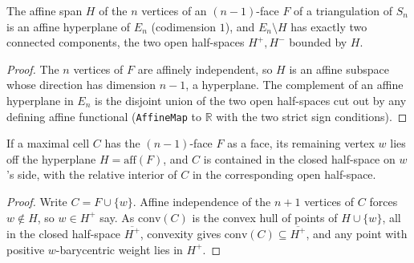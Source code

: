\begin{lemma}
    \label{lem:facet-hyperplane}
    The affine span $H$ of the $n$ vertices of an $(n-1)$-face $F$ of a
    triangulation of $S_n$ is an affine hyperplane of $E_n$ (codimension $1$),
    and $E_n \setminus H$ has exactly two connected components, the two open
    half-spaces $H^+, H^-$ bounded by $H$.
\end{lemma}
\begin{proof}
    The $n$ vertices of $F$ are affinely independent, so $H$ is an affine
    subspace whose direction has dimension $n-1$, a hyperplane. The complement of
    an affine hyperplane in $E_n$ is the disjoint union of the two open
    half-spaces cut out by any defining affine functional (\texttt{AffineMap}
    to $\mathbb R$ with the two strict sign conditions).
\end{proof}

\begin{lemma}
    \label{lem:cell-one-side}
    If a maximal cell $C$ has the $(n-1)$-face $F$ as a face, its remaining
    vertex $w$ lies off the hyperplane $H = \mathrm{aff}(F)$, and $C$ is contained
    in the closed half-space on $w$'s side, with the relative interior of $C$ in
    the corresponding open half-space.
\end{lemma}
\begin{proof}
    Write $C = F \cup \{w\}$. Affine independence of the $n+1$ vertices of $C$
    forces $w \notin H$, so $w \in H^+$ say. As $\mathrm{conv}(C)$ is the convex
    hull of points of $H \cup \{w\}$, all in the closed half-space $\overline{H^+}$,
    convexity gives $\mathrm{conv}(C) \subseteq \overline{H^+}$, and any point with
    positive $w$-barycentric weight lies in $H^+$.
\end{proof}

